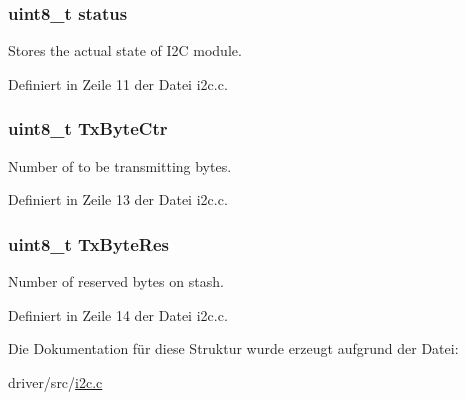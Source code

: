 \hypertarget{struct_i2_c___c_t_r_l_ade818037fd6c985038ff29656089758d}{}
\subsubsection[{status}]{\setlength{\rightskip}{0pt plus 5cm}uint8\+\_\+t {\bf status}}\label{struct_i2_c___c_t_r_l_ade818037fd6c985038ff29656089758d}


Stores the actual state of I2\+C module. 



Definiert in Zeile 11 der Datei i2c.\+c.

\hypertarget{struct_i2_c___c_t_r_l_aec22639ad7dc7eed52b3e116ea3223fe}{}
\subsubsection[{Tx\+Byte\+Ctr}]{\setlength{\rightskip}{0pt plus 5cm}uint8\+\_\+t Tx\+Byte\+Ctr}\label{struct_i2_c___c_t_r_l_aec22639ad7dc7eed52b3e116ea3223fe}


Number of to be transmitting bytes. 



Definiert in Zeile 13 der Datei i2c.\+c.

\hypertarget{struct_i2_c___c_t_r_l_a28b787f8db17314755d031d75ec38017}{}
\subsubsection[{Tx\+Byte\+Res}]{\setlength{\rightskip}{0pt plus 5cm}uint8\+\_\+t Tx\+Byte\+Res}\label{struct_i2_c___c_t_r_l_a28b787f8db17314755d031d75ec38017}


Number of reserved bytes on stash. 



Definiert in Zeile 14 der Datei i2c.\+c.



Die Dokumentation für diese Struktur wurde erzeugt aufgrund der Datei\+:\begin{DoxyCompactItemize}
\item 
driver/src/\hyperlink{i2c_8c}{i2c.\+c}\end{DoxyCompactItemize}
